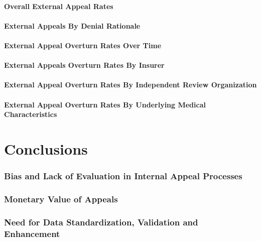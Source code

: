 \documentclass[12pt, a4paper,twoside]{report}
\theoremstyle{plain} %
\theoremstyle{definition} %
\theoremstyle{remark} %
\numberwithin{equation}{chapter}
\begin{document}
		\subsubsection{Overall External Appeal Rates}
		
		\subsubsection{External Appeals By Denial Rationale}
		
		\subsubsection{External Appeal Overturn Rates Over Time}
		
		\subsubsection{External Appeals Overturn Rates By Insurer}
		
		\subsubsection{External Appeal Overturn Rates By Independent Review Organization}
		
		\subsubsection{External Appeal Overturn Rates By Underlying Medical Characteristics}
		
		\chapter{Conclusions}\label{conclusions}
		
		\subsection{Bias and Lack of Evaluation in Internal Appeal Processes}
		
		\subsection{Monetary Value of Appeals}
		
		\subsection{Need for Data Standardization, Validation and Enhancement}
		
\end{document}
